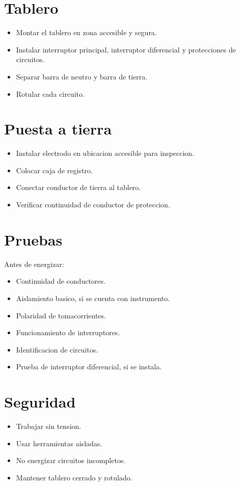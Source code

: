 \section{Tablero}

\begin{itemize}
  \item Montar el tablero en zona accesible y segura.
  \item Instalar interruptor principal, interruptor diferencial y protecciones de circuitos.
  \item Separar barra de neutro y barra de tierra.
  \item Rotular cada circuito.
\end{itemize}

\section{Puesta a tierra}

\begin{itemize}
  \item Instalar electrodo en ubicacion accesible para inspeccion.
  \item Colocar caja de registro.
  \item Conectar conductor de tierra al tablero.
  \item Verificar continuidad de conductor de proteccion.
\end{itemize}

\section{Pruebas}

Antes de energizar:

\begin{itemize}
  \item Continuidad de conductores.
  \item Aislamiento basico, si se cuenta con instrumento.
  \item Polaridad de tomacorrientes.
  \item Funcionamiento de interruptores.
  \item Identificacion de circuitos.
  \item Prueba de interruptor diferencial, si se instala.
\end{itemize}

\section{Seguridad}

\begin{itemize}
  \item Trabajar sin tension.
  \item Usar herramientas aisladas.
  \item No energizar circuitos incompletos.
  \item Mantener tablero cerrado y rotulado.
\end{itemize}
